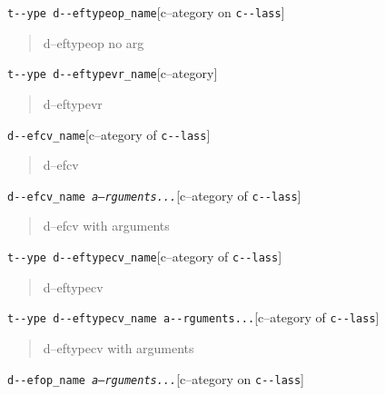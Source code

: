 \documentclass{book}
\begin{document}
\begin{titlepage}
\noindent\texttt{t{-}{-}ype d{-}{-}eftypeop\_name}\hfill[c--ategory on \texttt{c{-}{-}lass}]

%
\begin{quote}
\unskip{\parskip=0pt\noindent}%
d--eftypeop no arg
\end{quote}

\noindent\texttt{t{-}{-}ype d{-}{-}eftypevr\_name}\hfill[c--ategory]

%
\begin{quote}
\unskip{\parskip=0pt\noindent}%
d--eftypevr
\end{quote}

\noindent\texttt{d{-}{-}efcv\_name}\hfill[c--ategory of \texttt{c{-}{-}lass}]

%
\begin{quote}
\unskip{\parskip=0pt\noindent}%
d--efcv
\end{quote}

\noindent\texttt{d{-}{-}efcv\_name \EmbracOn{}\textnormal{\textsl{a--rguments...}}\EmbracOff{}}\hfill[c--ategory of \texttt{c{-}{-}lass}]

%
\begin{quote}
\unskip{\parskip=0pt\noindent}%
d--efcv with arguments
\end{quote}

\noindent\texttt{t{-}{-}ype d{-}{-}eftypecv\_name}\hfill[c--ategory of \texttt{c{-}{-}lass}]

%
\begin{quote}
\unskip{\parskip=0pt\noindent}%
d--eftypecv
\end{quote}

\noindent\texttt{t{-}{-}ype d{-}{-}eftypecv\_name a{-}{-}rguments...}\hfill[c--ategory of \texttt{c{-}{-}lass}]

%
\begin{quote}
\unskip{\parskip=0pt\noindent}%
d--eftypecv with arguments
\end{quote}

\noindent\texttt{d{-}{-}efop\_name \EmbracOn{}\textnormal{\textsl{a--rguments...}}\EmbracOff{}}\hfill[c--ategory on \texttt{c{-}{-}lass}]


\end{titlepage}
\end{document}
